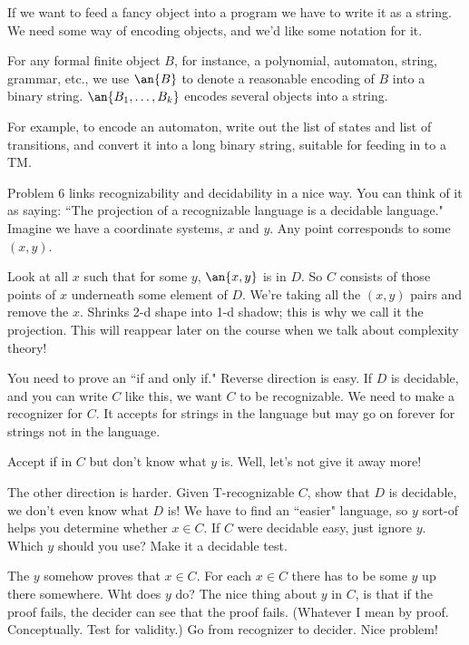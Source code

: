 If we want to feed a fancy object into a program we have to write it as a string. We need some way of encoding objects, and  we'd like some notation for it.

For any formal finite object $B$, for instance, a polynomial, automaton, string, grammar, etc., we use $\an{B}$ to denote a reasonable encoding of $B$ into a binary string. $\an{B_1,\ldots, B_k}$ encodes several objects into a string.

For example, to encode an automaton, write out the list of states and list of transitions, and convert it into a long binary string, suitable for feeding in to a TM.

Problem 6 links recognizability and decidability in a nice way. You can think of it as saying: ``The projection of a recognizable language is a decidable language."
Imagine we have a coordinate systems, $x$ and $y$. Any point corresponds to some $(x,y)$. 

Look at all $x$ such that for some $y$, $\an{x,y}$ is in $D$. So $C$ consists of those points of $x$ underneath some element of $D$. We're taking all the $(x,y)$ pairs  and remove the $x$.
Shrinks 2-d shape into 1-d shadow; %
this is why we call it the projection. This will reappear later on the course when we talk about complexity theory!

You need to prove an ``if and only if." Reverse direction is easy. If $D$ is decidable, and you can write $C$ like this, we want $C$ to be recognizable. We need to make a recognizer for $C$. It accepts for strings in the language but may go on forever for strings not in the language. 

Accept if in $C$ but don't know what $y$ is. Well, let's not give it away more!

The other direction is harder. Given T-recognizable $C$, show that $D$ is decidable, we don't even know what $D$ is! We have to find an ``easier" language, so $y$ sort-of helps you determine whether $x\in C$. If $C$ were decidable easy, just ignore $y$. Which $y$ should you use? Make it a decidable test. 

The $y$ somehow proves that $x\in C$. For each $x\in C$ there has to be some $y$ up there somewhere. Wht does $y$ do? The nice thing about $y$ in $C$, is that if the proof fails, the decider can see that the proof fails. (Whatever I  mean by proof. Conceptually. Test for validity.) Go from recognizer to decider. Nice problem!
